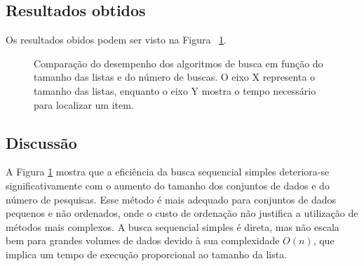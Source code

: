 \documentclass[12pt]{article}
\begin{document}

\subsection{Resultados obtidos}

    Os resultados obidos podem ser visto na Figura ~\ref{fig:resultados}.
    
    \begin{figure}[h]
        \centering
        

        
        \caption{Comparação do desempenho dos algoritmos de busca em função do tamanho das listas e do número de buscas. O eixo X representa o tamanho das listas, enquanto o eixo Y mostra o tempo necessário para localizar um item.}
        \label{fig:resultados}
    \end{figure}


\subsection{Discussão}
    A Figura \ref{fig:resultados} mostra que a eficiência da busca sequencial simples deteriora-se significativamente com o aumento do tamanho dos conjuntos de dados e do número de pesquisas. Esse método é mais adequado para conjuntos de dados pequenos e não ordenados, onde o custo de ordenação não justifica a utilização de métodos mais complexos. A busca sequencial simples é direta, mas não escala bem para grandes volumes de dados devido à sua complexidade \(O(n)\), que implica um tempo de execução proporcional ao tamanho da lista.
    
\end{document}
